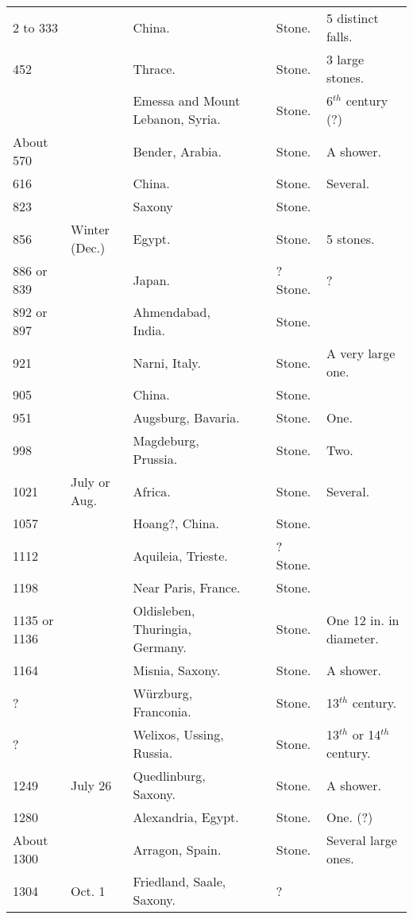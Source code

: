 \documentclass[a4paper, 12pt, oneside]{article}
\begin{document}
\begin{center}
\begin{longtable}{|p{10mm}|p{15mm}|p{32mm}|p{13mm}|p{13mm}|p{26mm}|}
        2 to 333 & ~ & China. & ~ & Stone. & 5 distinct falls. \\
        452 & ~ & Thrace. & ~ & Stone. & 3 large stones. \\
        ~ & ~ & Emessa and Mount Lebanon, Syria. & ~ & Stone. & 6$^{th}$ century (?) \\
        About 570 & ~ & Bender, Arabia. & ~ & Stone. & A shower. \\
        616 & ~ & China. & ~ & Stone. & Several. \\
        823 & ~ & Saxony & ~ & Stone. & ~ \\
        856 & Winter (Dec.) & Egypt. & ~ & Stone. & 5 stones. \\
        886 or 839 & ~ & Japan. & ~ & ? Stone. & ? \\
        892 or 897 & ~ & Ahmendabad, India. & ~ & Stone. & ~ \\
        921 & ~ & Narni, Italy. & ~ & Stone. & A very large one. \\
        905 & ~ & China. & ~ & Stone. & ~ \\
        951 & ~ & Augsburg, Bavaria. & ~ & Stone. & One. \\
        998 & ~ & Magdeburg, Prussia. & ~ & Stone. & Two. \\
        1021 & July or Aug. & Africa. & ~ & Stone. & Several. \\
        1057 & ~ & Hoang?, China. & ~ & Stone. & ~ \\
        1112 & ~ & Aquileia, Trieste. & ~ & ? Stone. & ~ \\
        1198 & ~ & Near Paris, France. & ~ & Stone. & ~ \\
        1135 or 1136 & ~ & Oldisleben, Thuringia, Germany. & ~ & Stone. & One 12 in. in diameter. \\
        1164 & ~ & Misnia, Saxony. & ~ & Stone. & A shower. \\
        ? & ~ & Würzburg, Franconia. & ~ & Stone. & 13$^{th}$ century. \\
        ? & ~ & Welixos, Ussing, Russia. & ~ & Stone. & 13$^{th}$ or 14$^{th}$ century. \\
        1249 & July 26 & Quedlinburg, Saxony. & ~ & Stone. & A shower. \\
        1280 & ~ & Alexandria, Egypt. & ~ & Stone. & One. (?) \\
        About 1300 & ~ & Arragon, Spain. & ~ & Stone. & Several large ones. \\
        1304 & Oct. 1 & Friedland, Saale, Saxony. & ~ & ? & ~ \\

\end{longtable}
\end{center}
\end{document}
